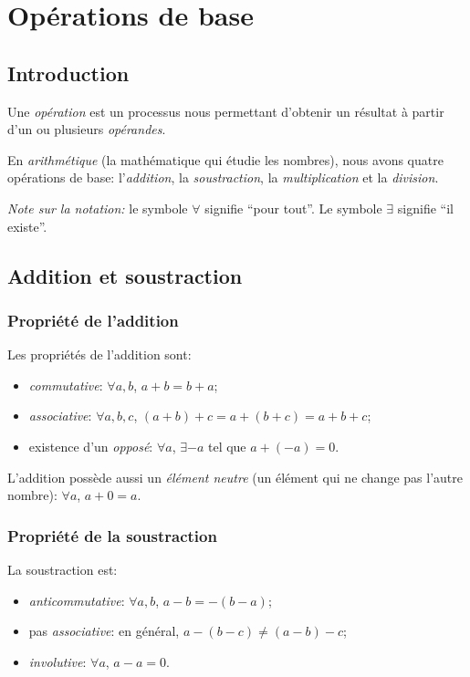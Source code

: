 \chapter{Opérations de base}

\section{Introduction}

\begin{definition}
    Une \emph{opération} est un processus nous permettant d'obtenir un résultat à partir d'un ou plusieurs \emph{opérandes}.
\end{definition}

\noindent En \emph{arithmétique} (la mathématique qui étudie les nombres), nous avons quatre opérations de base: l'\emph{addition}, la \emph{soustraction}, la \emph{multiplication} et la \emph{division}.

\noindent \textit{Note sur la notation:} le symbole $\forall$ signifie ``pour tout''. Le symbole $\exists$ signifie ``il existe''.

\section{Addition et soustraction}

\subsection{Propriété de l'addition}

Les propriétés de l'addition sont:
\begin{itemize}
    \item \emph{commutative}: $\forall a,b$, $a+b = b+a$;
    \item \emph{associative}: $\forall a,b,c$, $(a+b)+c = a+(b+c) = a+b+c$;
    \item existence d'un \emph{opposé}: $\forall a$, $\exists -a$ tel que $a + (-a) = 0$.
\end{itemize}

\noindent L'addition possède aussi un \emph{élément neutre} (un élément qui ne change pas l'autre nombre): $\forall a$, $a + 0 = a$.


\subsection{Propriété de la soustraction}

La soustraction est:
\begin{itemize}
    \item \emph{anticommutative}: $\forall a,b$, $a - b = -(b -a)$;
    \item pas \emph{associative}: en général, $a-(b-c) \not= (a-b) - c$;
    \item \emph{involutive}: $\forall a$, $a-a = 0$.
\end{itemize}

